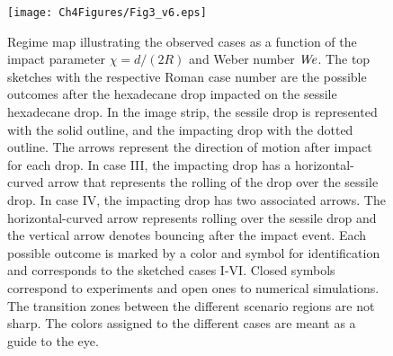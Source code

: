 \begin{figure}
	\centering
	\texttt{[image: Ch4Figures/Fig3\_v6.eps]}
	\caption{Regime map illustrating the observed cases as a function of the impact parameter $\chi=d/\left(2R\right)$ and Weber number $\mathit{We}$. The top sketches with the respective Roman case number are the possible outcomes after the hexadecane drop impacted on the sessile hexadecane drop. In the image strip, the sessile drop is represented with the solid outline, and the impacting drop with the dotted outline. The arrows represent the direction of motion after impact for each drop. In case III, the impacting drop has a horizontal-curved arrow that represents the rolling of the drop over the sessile drop. In case IV, the impacting drop has two associated arrows. The horizontal-curved arrow represents rolling over the sessile drop and the vertical arrow denotes bouncing after the impact event. Each possible outcome is marked by a color and symbol for identification and corresponds to the sketched cases I-VI. Closed symbols correspond to experiments and open ones to numerical simulations. The transition zones between the different scenario regions are not sharp. The colors assigned to the different cases are meant as a guide to the eye. }
	\label{ChDoD:fig3}
\end{figure}

